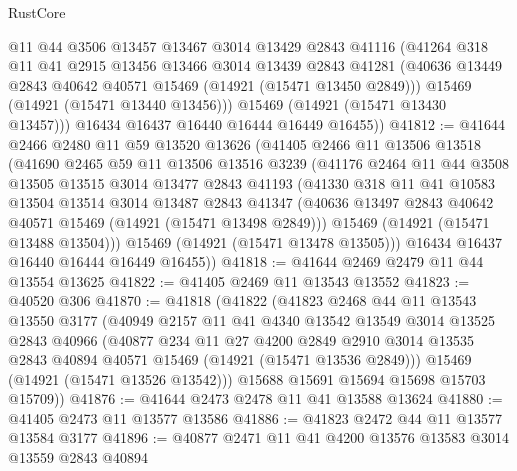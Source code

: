\begin{lexlean}{RustCore}
\begin{coremodule}
          @11
          @44
          @3506
          @13457
          @13467
          @3014
          @13429
          @2843
          @41116
          (@41264
            @318
            @11
            @41
            @2915
            @13456
            @13466
            @3014
            @13439
            @2843
            @41281
            (@40636 @13449 @2843 @40642 @40571 @15469 (@14921 (@15471 @13450 @2849)))
            @15469
            (@14921 (@15471 @13440 @13456)))
          @15469
          (@14921 (@15471 @13430 @13457)))
        @16434
        @16437
        @16440
        @16444
        @16449
        @16455))
@41812 := @41644
    @2466
    @2480
    @11
    @59
    @13520
    @13626
    (@41405
      @2466
      @11
      @13506
      @13518
      (@41690
        @2465
        @59
        @11
        @13506
        @13516
        @3239
        (@41176
          @2464
          @11
          @44
          @3508
          @13505
          @13515
          @3014
          @13477
          @2843
          @41193
          (@41330
            @318
            @11
            @41
            @10583
            @13504
            @13514
            @3014
            @13487
            @2843
            @41347
            (@40636 @13497 @2843 @40642 @40571 @15469 (@14921 (@15471 @13498 @2849)))
            @15469
            (@14921 (@15471 @13488 @13504)))
          @15469
          (@14921 (@15471 @13478 @13505)))
        @16434
        @16437
        @16440
        @16444
        @16449
        @16455))
@41818 := @41644 @2469 @2479 @11 @44 @13554 @13625
@41822 := @41405 @2469 @11 @13543 @13552
@41823 := @40520 @306
@41870 := @41818
    (@41822
      (@41823
        @2468
        @44
        @11
        @13543
        @13550
        @3177
        (@40949
          @2157
          @11
          @41
          @4340
          @13542
          @13549
          @3014
          @13525
          @2843
          @40966
          (@40877
            @234
            @11
            @27
            @4200
            @2849
            @2910
            @3014
            @13535
            @2843
            @40894
            @40571
            @15469
            (@14921 (@15471 @13536 @2849)))
          @15469
          (@14921 (@15471 @13526 @13542)))
        @15688
        @15691
        @15694
        @15698
        @15703
        @15709))
@41876 := @41644 @2473 @2478 @11 @41 @13588 @13624
@41880 := @41405 @2473 @11 @13577 @13586
@41886 := @41823 @2472 @44 @11 @13577 @13584 @3177
@41896 := @40877 @2471 @11 @41 @4200 @13576 @13583 @3014 @13559 @2843 @40894

\end{coremodule}
\end{lexlean}

